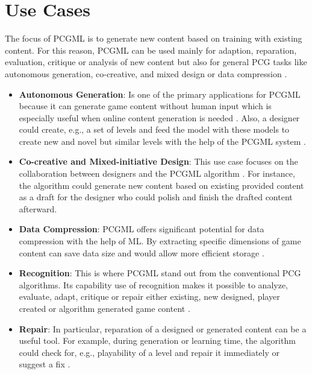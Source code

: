 \documentclass[MGS,Master,english]{twbook}%
\begin{document}
\section{Use Cases}
The focus of PCGML is to generate new content based on training with existing content. For this reason, PCGML can be used mainly for adaption, reparation, evaluation, critique or analysis of new content but also for general PCG tasks like autonomous generation, co-creative, and mixed design or data compression \cite{pcgml::paper}.
\begin{itemize}
	\item \textbf{Autonomous Generation}: Is one of the primary applications for PCGML because it can generate game content without human input which is especially useful when online content generation is needed \cite{pcgml::paper}. Also, a designer could create, e.g., a set of levels and feed the model with these models to create new and novel but similar levels with the help of the PCGML system \cite{pcgml::paper}.
	\item \textbf{Co-creative and Mixed-initiative Design}: This use case focuses on the collaboration between designers and the PCGML algorithm \cite{pcgml::paper}. For instance, the algorithm could generate new content based on existing provided content as a draft for the designer who could polish and finish the drafted content afterward.
	\item \textbf{Data Compression}: PCGML offers significant potential for data compression with the help of ML. By extracting specific dimensions of game content can save data size and would allow more efficient storage \cite{pcgml::paper}.
	\item \textbf{Recognition}: This is where PCGML stand out from the conventional PCG algorithms. Its capability use of recognition makes it possible to analyze, evaluate, adapt, critique or repair either existing, new designed, player created or algorithm generated game content \cite{pcgml::paper}. 
	\item \textbf{Repair}: In particular, reparation of a designed or generated content can be a useful tool. For example, during generation or learning time, the algorithm could check for, e.g., playability of a level and repair it immediately or suggest a fix \cite{pcgml::paper}.
\end{itemize}
\end{document}
